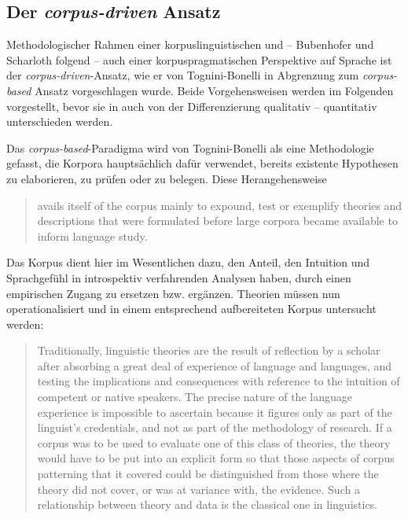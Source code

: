 \subsection{\texorpdfstring{Der \emph{corpus-driven} Ansatz}{Der corpus-driven Ansatz}}\label{der-corpus-driven-ansatz}

Methodologischer Rahmen einer korpuslinguistischen und -- Bubenhofer und Scharloth folgend -- auch einer korpuspragmatischen Perspektive auf Sprache ist der \emph{corpus-driven}-Ansatz, wie er von Tognini-Bonelli \autocite*{tognini-bonelliCorpusLinguisticsWork2001} in Abgrenzung zum \emph{corpus-based} Ansatz vorgeschlagen wurde. Beide Vorgehensweisen werden im Folgenden vorgestellt, bevor sie in  auch von der Differenzierung qualitativ -- quantitativ unterschieden werden.

Das \emph{corpus-based}-Paradigma wird von Tognini-Bonelli als eine Methodologie gefasst, die Korpora hauptsächlich dafür verwendet, bereits existente Hypothesen zu elaborieren, zu prüfen oder zu belegen. Diese Herangehensweise

\begin{quote}
avails itself of the corpus mainly to expound, test or exemplify theories and descriptions that were formulated before large corpora became available to inform language study. \autocite[65]{tognini-bonelliCorpusLinguisticsWork2001}
\end{quote}

Das Korpus dient hier im Wesentlichen dazu, den Anteil, den Intuition und Sprachgefühl in introspektiv verfahrenden Analysen haben, durch einen empirischen Zugang zu ersetzen bzw. ergänzen. Theorien müssen nun operationalisiert und in einem entsprechend aufbereiteten Korpus untersucht werden:

\begin{quote}
Traditionally, linguistic theories are the result of reflection by a scholar after absorbing a great deal of experience of language and languages, and testing the implications and consequences with reference to the intuition of competent or native speakers. The precise nature of the language experience is impossible to ascertain because it figures only as part of the linguist's credentials, and not as part of the methodology of research. If a corpus was to be used to evaluate one of this class of theories, the theory would have to be put into an explicit form so that those aspects of corpus patterning that it covered could be distinguished from those where the theory did not cover, or was at variance with, the evidence. Such a relationship between theory and data is the classical one in linguistics. \autocite[65]{tognini-bonelliCorpusLinguisticsWork2001}
\end{quote}

